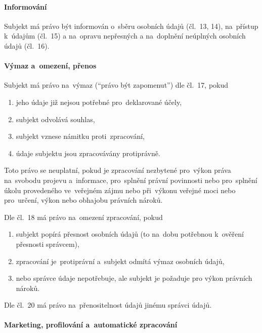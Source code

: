 \paragraph{Informování}

Subjekt má právo být informován o~sběru osobních údajů (čl.~13, 14), na~přístup k~údajům (čl.~15) a na~opravu nepřesných a na~doplnění neúplných osobních údajů (čl.~16).


\paragraph{Výmaz a~omezení, přenos}

Subjekt má právo na~výmaz (\enquote{právo být zapomenut}) dle čl.~17, pokud

\begin{enumerate}[label=\alph*)]
\item jeho údaje již nejsou potřebné pro~deklarované účely,
\item subjekt odvolává souhlas,
\item subjekt vznese námitku proti~zpracování,
\item údaje subjektu jsou zpracovávány protiprávně.
\end{enumerate}

Toto právo se neuplatní, pokud je zpracování nezbytené pro~výkon práva na~svobodu projevu a~informace, pro~splnění právní povinnosti nebo pro~splnění úkolu provedeného ve~veřejném zájmu nebo při~výkonu veřejné moci nebo pro~určení, výkon nebo obhajobu právních nároků.

Dle čl.~18 má právo na~omezení zpracování, pokud

\begin{enumerate}[label=\alph*)]
\item subjekt popírá přesnost osobních údajů (to na~dobu potřebnou k~ověření přesnosti správcem),
\item zpracování je~protiprávní a~subjekt odmítá výmaz osobních údajů,
\item nebo správce údaje nepotřebuje, ale subjekt je požaduje pro výkon právních nároků.
\end{enumerate}

Dle čl.~20 má právo na~přenositelnost údajů jinému správci údajů.

\paragraph{Marketing, profilování a~automatické zpracování}

